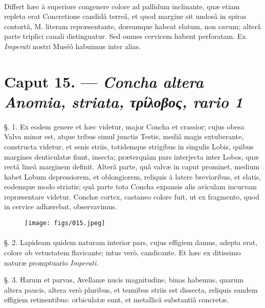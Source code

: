 \documentclass[a4paper, 11pt, oneside, polutonikogreek, german]{article}
\begin{document}
\paragraph{}
Differt hæc à superiore congenere colore ad pallidum inclinante, quæ etiam repleta erat Concretione candidâ terreâ, et quod margine sit undosâ in spiras contortâ, M. literam repræsentante, dorsumque habeat elatum, non cavum; alterâ parte triplici canali distinguatur. Sed omnes cervicem habent perforatam. Ex \emph{Imperati} nostri Muséô habuimus inter alias.

\section{Caput 15. --- \emph{Concha altera Anomia, striata, τρίλοβος, rario 1}}
\paragraph{}
§. 1. Ex eodem genere et hæc videtur, major Concha et crassior; cujus obesa Valva minor est, atque tribus simul junctis Testis, mediâ magis extuberante, constructa videtur, et senis striis, totidemque strigibus in singulis Lobis, quibus margines denticulatæ fiunt, insecta; præterquàm pars interjecta inter Lobos, quæ rectâ lineâ marginem definit. Alterâ parte, quâ valvæ in caput prominet, medium habet Lobum depressiorem, et oblongiorem, reliquis à latere brevioribus, et elatis, eodemque modo striatis; quâ parte tota Concha expansis alis aviculam incurvam repræsentare videtur. Conchæ cortex, castaneo colore fuit, ut ex fragmento, quod in cervice adhærebat, observavimus.

\begin{figure}[H]
\centering
\texttt{[image: figs/015.jpeg]}

\end{figure}
\paragraph{}
§. 2. Lapideam quidem naturam interior pars, cujus effigiem damus, adepta erat, colore ob vetustatem flavicante; intus verò, candicante. Et hæc ex ditissimo naturæ promptuario \emph{Imperati}.

§. 3. Harum et parvas, Avellanæ nucis magnitudine, binas habemus, quarum altera paucis, altera verò pluribus, et tenuibus striis est dissecta, reliquis eandem effigiem retinentibus: orbiculatæ sunt, et metallicâ substantiâ concretæ.
\end{document}
